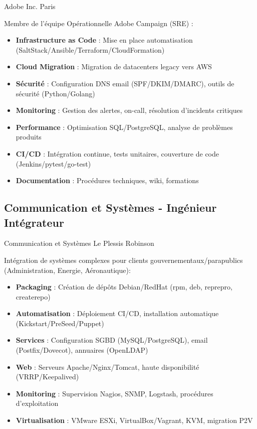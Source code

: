 \documentclass[10pt,a4paper,sans]{moderncv}
\begin{document}
        {Adobe Inc.}
        {Paris}
        {}
        {Membre de l'équipe Opérationnelle Adobe Campaign (SRE) :
            \begin{itemize}
            \item \textbf{Infrastructure as Code} : Mise en place automatisation (SaltStack/Ansible/Terraform/CloudFormation)
            \item \textbf{Cloud Migration} : Migration de datacenters legacy vers AWS
            \item \textbf{Sécurité} : Configuration DNS email (SPF/DKIM/DMARC), outils de sécurité (Python/Golang)
            \item \textbf{Monitoring} : Gestion des alertes, on-call, résolution d'incidents critiques
            \item \textbf{Performance} : Optimisation SQL/PostgreSQL, analyse de problèmes produits
            \item \textbf{CI/CD} : Intégration continue, tests unitaires, couverture de code (Jenkins/pytest/go-test)
            \item \textbf{Documentation} : Procédures techniques, wiki, formations
            \end{itemize}
        }

\subsection{Communication et Systèmes - Ingénieur Intégrateur}
        {Communication et Systèmes}
        {Le Plessis Robinson}
        {}
        {Intégration de systèmes complexes pour clients gouvernementaux/parapublics (Administration, Energie, Aéronautique):
            \begin{itemize}
            \item \textbf{Packaging} : Création de dépôts Debian/RedHat (rpm, deb, reprepro, createrepo)
            \item \textbf{Automatisation} : Déploiement CI/CD, installation automatique (Kickstart/PreSeed/Puppet)
            \item \textbf{Services} : Configuration SGBD (MySQL/PostgreSQL), email (Postfix/Dovecot), annuaires (OpenLDAP)
            \item \textbf{Web} : Serveurs Apache/Nginx/Tomcat, haute disponibilité (VRRP/Keepalived)
            \item \textbf{Monitoring} : Supervision Nagios, SNMP, Logstash, procédures d'exploitation
            \item \textbf{Virtualisation} : VMware ESXi, VirtualBox/Vagrant, KVM, migration P2V
            \end{itemize}
        }
\end{document}
